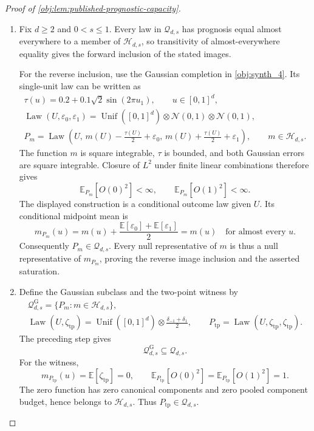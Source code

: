 \documentclass[11pt]{article}
\begin{document}
\begin{proof}[Proof of \cref{obj:lem:published-prognostic-capacity}]
\begin{enumerate}
\item Fix \(d\geq2\) and \(0<s\leq1\). Every law in \(\mathcal Q_{d,s}\) has prognosis equal almost everywhere to a member of \(\mathcal H_{d,s}\), so transitivity of almost-everywhere equality gives the forward inclusion of the stated images.

For the reverse inclusion, use the Gaussian completion in \cref{obj:synth_4}. Its single-unit law can be written as
\[
\begin{gathered}
\tau(u)=0.2+0.1\sqrt2\sin(2\pi u_1),
\qquad u\in[0,1]^d,\\
\operatorname{Law}(U,\varepsilon_0,\varepsilon_1)
=\operatorname{Unif}([0,1]^d)\otimes
\mathcal N(0,1)\otimes\mathcal N(0,1),\\
P_m=\operatorname{Law}\!\left(
U,\,
m(U)-\frac{\tau(U)}2+\varepsilon_0,\,
m(U)+\frac{\tau(U)}2+\varepsilon_1
\right),
\qquad m\in\mathcal H_{d,s}.
\end{gathered}
\]
The function \(m\) is square integrable, \(\tau\) is bounded, and both Gaussian errors are square integrable. Closure of \(L^2\) under finite linear combinations therefore gives
\[
\mathbb E_{P_m}[O(0)^2]<\infty,
\qquad
\mathbb E_{P_m}[O(1)^2]<\infty.
\]
The displayed construction is a conditional outcome law given \(U\). Its conditional midpoint mean is
\[
m_{P_m}(u)
=m(u)+\frac{\mathbb E[\varepsilon_0]+\mathbb E[\varepsilon_1]}2
=m(u)
\quad\text{for almost every }u.
\]
Consequently \(P_m\in\mathcal Q_{d,s}\). Every null representative of \(m\) is thus a null representative of \(m_{P_m}\), proving the reverse image inclusion and the asserted saturation.

\item Define the Gaussian subclass and the two-point witness by
\[
\begin{gathered}
\mathcal Q^{\mathrm G}_{d,s}
=\{P_m:m\in\mathcal H_{d,s}\},\\
\operatorname{Law}(U,\zeta_{\mathrm{tp}})
=\operatorname{Unif}([0,1]^d)\otimes
\frac{\delta_{-1}+\delta_1}{2},
\qquad
P_{\mathrm{tp}}=\operatorname{Law}(U,\zeta_{\mathrm{tp}},\zeta_{\mathrm{tp}}).
\end{gathered}
\]
The preceding step gives
\[
\mathcal Q^{\mathrm G}_{d,s}\subseteq\mathcal Q_{d,s}.
\]
For the witness,
\[
m_{P_{\mathrm{tp}}}(u)=\mathbb E[\zeta_{\mathrm{tp}}]=0,
\qquad
\mathbb E_{P_{\mathrm{tp}}}[O(0)^2]
=\mathbb E_{P_{\mathrm{tp}}}[O(1)^2]=1.
\]
The zero function has zero canonical components and zero pooled component budget, hence belongs to \(\mathcal H_{d,s}\). Thus \(P_{\mathrm{tp}}\in\mathcal Q_{d,s}\).


\end{enumerate}
\end{proof}
\end{document}
